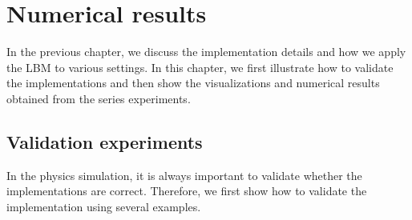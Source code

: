 \chapter{Numerical results}
\vspace{-8mm}
In the previous chapter, we discuss the implementation details
and how we apply the LBM to various settings.
In this chapter, we first illustrate
how to validate the implementations and 
then show the visualizations and numerical results
obtained from the series experiments.

\section{Validation experiments}
In the physics simulation, it is always important
to validate whether the implementations are correct.
Therefore, we first show how to validate the implementation
using several examples.

